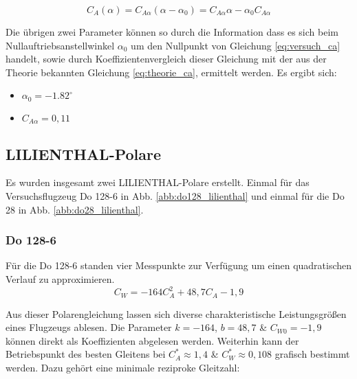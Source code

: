\begin{equation}  \label{eq:theorie_ca}
C_A(\alpha) = C_{A\alpha}(\alpha - \alpha_0)=C_{A\alpha}\alpha - \alpha_0 C_{A\alpha}
\end{equation}

\vspace{3mm} \noindent
Die übrigen zwei Parameter können so durch die Information dass es sich beim Nullauftriebsanstellwinkel $\alpha_0$ um den Nullpunkt von Gleichung \ref{eq:versuch_ca} handelt, sowie durch Koeffizientenvergleich dieser Gleichung mit der aus der Theorie bekannten Gleichung \ref{eq:theorie_ca}, ermittelt werden. Es ergibt sich:\\

\begin{itemize}
	\item $\alpha_0=-1.82 ^\circ$
	\item $C_{A\alpha}= 0,11$
\end{itemize}

\vspace{5mm} \noindent

\subsection{LILIENTHAL-Polare}
Es wurden insgesamt zwei LILIENTHAL-Polare erstellt. Einmal für das Versuchsflugzeug Do 128-6 in Abb. \ref{abb:do128_lilienthal} und einmal für die Do 28 in Abb. \ref{abb:do28_lilienthal}.\\
\subsubsection{Do 128-6}
Für die Do 128-6 standen vier Messpunkte zur Verfügung um einen quadratischen Verlauf zu approximieren.\\

\begin{equation}
C_W=-164C_{A}^2+48,7C_A-1,9
\end{equation}

\vspace{3mm} \noindent
Aus dieser Polarengleichung lassen sich diverse charakteristische Leistungsgrößen eines Flugzeugs ablesen. Die Parameter $k=-164$, $b=48,7$ \& $C_{W0}=-1,9$ können direkt als Koeffizienten abgelesen werden. Weiterhin kann der Betriebspunkt des besten Gleitens bei $C_{A}^* \approx 1,4$ \& $C_{W}^* \approx 0,108$ grafisch bestimmt werden. Dazu gehört eine minimale reziproke Gleitzahl:\\

